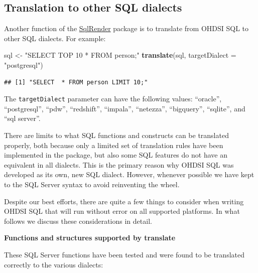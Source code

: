 \documentclass[11pt]{book}
\newenvironment{Shaded}{\begin{snugshade}}{\end{snugshade}}
\newcommand{\DataTypeTok}[1]{\textcolor[rgb]{0.13,0.29,0.53}{#1}}
\newcommand{\KeywordTok}[1]{\textcolor[rgb]{0.13,0.29,0.53}{\textbf{#1}}}
\newcommand{\NormalTok}[1]{#1}
\newcommand{\StringTok}[1]{\textcolor[rgb]{0.31,0.60,0.02}{#1}}
\theoremstyle{definition}
\theoremstyle{definition}
\theoremstyle{definition}
\theoremstyle{remark}
\let\BeginKnitrBlock\begin \let\EndKnitrBlock\end
\begin{document}
\hypertarget{translation-to-other-sql-dialects}{%
\subsection{Translation to other SQL dialects}\label{translation-to-other-sql-dialects}}

Another function of the \href{https://ohdsi.github.io/SqlRender/}{SqlRender} package is to translate from OHDSI SQL to other SQL dialects. For example:

\begin{Shaded}
\begin{Highlighting}[]
\NormalTok{sql <-}\StringTok{ "SELECT TOP 10 * FROM person;"}
\KeywordTok{translate}\NormalTok{(sql, }\DataTypeTok{targetDialect =} \StringTok{"postgresql"}\NormalTok{)}
\end{Highlighting}
\end{Shaded}

\begin{verbatim}
## [1] "SELECT  * FROM person LIMIT 10;"
\end{verbatim}

The \texttt{targetDialect} parameter can have the following values: ``oracle'', ``postgresql'', ``pdw'', ``redshift'', ``impala'', ``netezza'', ``bigquery'', ``sqlite'', and ``sql server''.

\BeginKnitrBlock{rmdimportant}
There are limits to what SQL functions and constructs can be translated properly, both because only a limited set of translation rules have been implemented in the package, but also some SQL features do not have an equivalent in all dialects. This is the primary reason why OHDSI SQL was developed as its own, new SQL dialect. However, whenever possible we have kept to the SQL Server syntax to avoid reinventing the wheel.
\EndKnitrBlock{rmdimportant}

Despite our best efforts, there are quite a few things to consider when writing OHDSI SQL that will run without error on all supported platforms. In what follows we discuss these considerations in detail.

\textbf{Functions and structures supported by translate}

These SQL Server functions have been tested and were found to be translated correctly to the various dialects:
\end{document}
